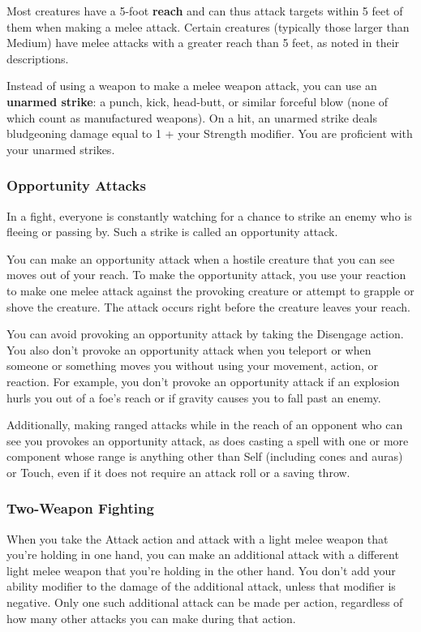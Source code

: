 Most creatures have a 5-foot \textbf{reach} and can thus attack targets within 5 feet of them when making a melee attack. Certain creatures (typically those larger than Medium) have melee attacks with a greater reach than 5 feet, as noted in their descriptions.

Instead of using a weapon to make a melee weapon attack, you can use an \textbf{unarmed strike}: a punch, kick, head-butt, or similar forceful blow (none of which count as manufactured weapons). On a hit, an unarmed strike deals bludgeoning damage equal to 1 + your Strength modifier. You are proficient with your unarmed strikes.

\subsubsection{Opportunity Attacks}\label{sec:opportunity-attacks}

In a fight, everyone is constantly watching for a chance to strike an enemy who is fleeing or passing by. Such a strike is called an opportunity attack.

You can make an opportunity attack when a hostile creature that you can see moves out of your reach. To make the opportunity attack, you use your reaction to make one melee attack against the provoking creature or attempt to grapple or shove the creature. The attack occurs right before the creature leaves your reach.

You can avoid provoking an opportunity attack by taking the Disengage action. You also don't provoke an opportunity attack when you teleport or when someone or something moves you without using your movement, action, or reaction. For example, you don't provoke an opportunity attack if an explosion hurls you out of a foe's reach or if gravity causes you to fall past an enemy.

Additionally, making ranged attacks while in the reach of an opponent who can see you provokes an opportunity attack, as does casting a spell with one or more component whose range is anything other than Self (including cones and auras) or Touch, even if it does not require an attack roll or a saving throw.

\subsubsection{Two-Weapon Fighting}

When you take the Attack action and attack with a light melee weapon that you're holding in one hand, you can make an additional attack with a different light melee weapon that you're holding in the other hand. You don't add your ability modifier to the damage of the additional attack, unless that modifier is negative. Only one such additional attack can be made per action, regardless of how many other attacks you can make during that action.

